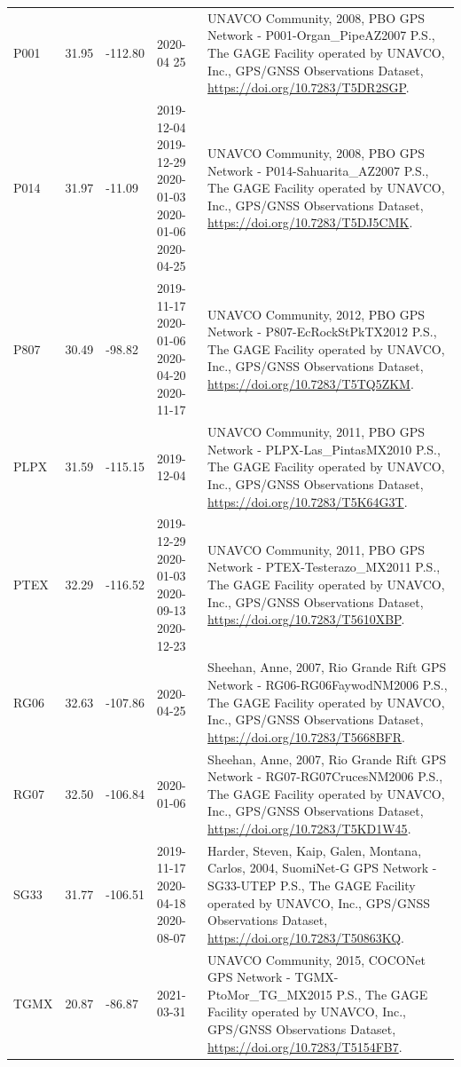 \documentclass[times,twocolumn,final,authoryear]{elsarticle}
\begin{document}
\begin{landscape}
\begin{longtable}{lllp{4cm}p{10cm}}
    P001 & 31.95 & -112.80 & 2020-04 25 & UNAVCO Community, 2008, PBO GPS Network - P001-Organ\_PipeAZ2007 P.S., The GAGE Facility operated by UNAVCO, Inc., GPS/GNSS Observations Dataset, \url{https://doi.org/10.7283/T5DR2SGP}.\\
    P014 & 31.97 & -11.09 & 2019-12-04 2019-12-29 2020-01-03 2020-01-06 2020-04-25 & UNAVCO Community, 2008, PBO GPS Network - P014-Sahuarita\_AZ2007 P.S., The GAGE Facility operated by UNAVCO, Inc., GPS/GNSS Observations Dataset, \url{https://doi.org/10.7283/T5DJ5CMK}.\\
    P807 & 30.49 & -98.82 & 2019-11-17 2020-01-06 2020-04-20 2020-11-17 & UNAVCO Community, 2012, PBO GPS Network - P807-EcRockStPkTX2012 P.S., The GAGE Facility operated by UNAVCO, Inc., GPS/GNSS Observations Dataset, \url{https://doi.org/10.7283/T5TQ5ZKM}.\\
    PLPX & 31.59 & -115.15 & 2019-12-04 & UNAVCO Community, 2011, PBO GPS Network - PLPX-Las\_PintasMX2010 P.S., The GAGE Facility operated by UNAVCO, Inc., GPS/GNSS Observations Dataset, \url{https://doi.org/10.7283/T5K64G3T}.\\
    PTEX & 32.29 & -116.52 & 2019-12-29 2020-01-03 2020-09-13 2020-12-23 & UNAVCO Community, 2011, PBO GPS Network - PTEX-Testerazo\_MX2011 P.S., The GAGE Facility operated by UNAVCO, Inc., GPS/GNSS Observations Dataset, \url{https://doi.org/10.7283/T5610XBP}.\\
    RG06 & 32.63 & -107.86 & 2020-04-25 & Sheehan, Anne, 2007, Rio Grande Rift GPS Network - RG06-RG06FaywodNM2006 P.S., The GAGE Facility operated by UNAVCO, Inc., GPS/GNSS Observations Dataset, \url{https://doi.org/10.7283/T5668BFR}.\\
    RG07 & 32.50 & -106.84 & 2020-01-06 & Sheehan, Anne, 2007, Rio Grande Rift GPS Network - RG07-RG07CrucesNM2006 P.S., The GAGE Facility operated by UNAVCO, Inc., GPS/GNSS Observations Dataset, \url{https://doi.org/10.7283/T5KD1W45}. \\
    SG33 & 31.77 & -106.51 & 2019-11-17 2020-04-18 2020-08-07 & Harder, Steven, Kaip, Galen, Montana, Carlos, 2004, SuomiNet-G GPS Network - SG33-UTEP P.S., The GAGE Facility operated by UNAVCO, Inc., GPS/GNSS Observations Dataset, \url{https://doi.org/10.7283/T50863KQ}.\\
    TGMX  & 20.87 & -86.87 & 2021-03-31 & UNAVCO Community, 2015, COCONet GPS Network - TGMX-PtoMor\_TG\_MX2015 P.S., The GAGE Facility operated by UNAVCO, Inc., GPS/GNSS Observations Dataset, \url{https://doi.org/10.7283/T5154FB7}.\\

\end{longtable}
\end{landscape}
\end{document}
